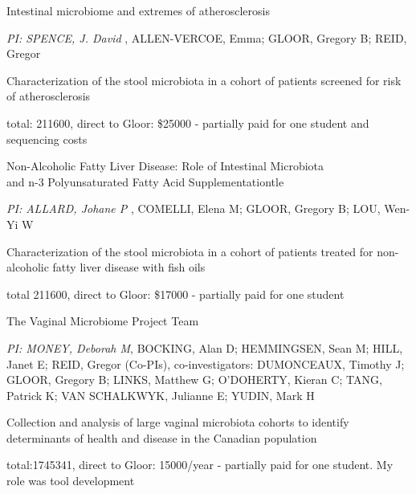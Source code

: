 \documentclass[11pt]{article}
\begin{document}
\begin{description}
\setlength\itemsep{0em}

\item[CIHR 2014-1016:] Intestinal microbiome and extremes of atherosclerosis

\setlength\itemindent{-1em}

\item {\em PI: SPENCE, J. David },  ALLEN-VERCOE, Emma; GLOOR, Gregory B; REID, Gregor
\item Characterization of the stool microbiota in a cohort of patients screened for risk of atherosclerosis	
	
\item total: 211600, direct to Gloor: \$25000 - partially paid for one student and sequencing costs
\end{description}
\begin{description}
\setlength\itemsep{0em}

\item[CIHR 2013-1016:] Non-Alcoholic Fatty Liver Disease: Role of Intestinal Microbiota\\ and n-3 Polyunsaturated Fatty Acid Supplementationtle

\setlength\itemindent{-1em}

\item {\em PI: ALLARD, Johane P  },  COMELLI, Elena M; GLOOR, Gregory B; LOU, Wen-Yi W
\item Characterization of the stool microbiota in a cohort of patients treated for non-alcoholic fatty liver disease with fish oils	
\item total 211600, direct to Gloor: \$17000 - partially paid for one student
\end{description}
\begin{description}
\setlength\itemsep{0em}

\item[CIHR Team grant, 2010-2015:] The Vaginal Microbiome Project Team

\setlength\itemindent{-1em}

\item {\em PI: MONEY, Deborah M}, BOCKING, Alan D; HEMMINGSEN, Sean M; HILL, Janet E; REID, Gregor (Co-PIs), co-investigators: DUMONCEAUX, Timothy J; GLOOR, Gregory B; LINKS, Matthew G; O'DOHERTY, Kieran C; TANG, Patrick K; VAN SCHALKWYK, Julianne E; YUDIN, Mark H
\item Collection and analysis of large vaginal microbiota cohorts to identify determinants of health and disease in the Canadian population	
\item total:1745341, direct to Gloor: 15000/year - partially paid for one student. My role was tool development

\end{description}
\end{document}
